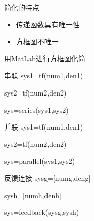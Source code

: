  \begin{frame}
 \end{frame}
 \begin{frame}
 \begin{block}{简化的特点}
 \begin{itemize}
 \item 传递函数具有唯一性
 \item 方框图不唯一
 \end{itemize}
 \end{block}
 \end{frame}
 \begin{frame}{用MatLab进行方框图化简}
 \begin{block}{串联}
 sys1=tf(num1,den1)
 
 sys2=tf(num2,den2)
 
 sys=series(sys1,sys2)
 \end{block}
 \begin{block}{并联}
 sys1=tf(num1,den1)
 
 sys2=tf(num2,den2)
 
 sys=parallel(sys1,sys2)
 \end{block}
 \end{frame}
 \begin{frame}
 \begin{block}{反馈连接}
sysg=[numg,deng]

sysh=[numh,denh]

sys=feedback(sysg,sysh)
 \end{block}
 \end{frame}
